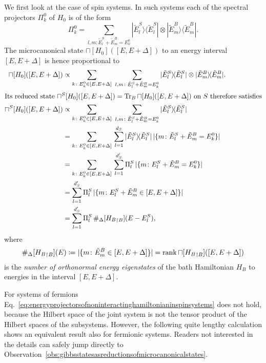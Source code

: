 \documentclass[a4paper,12pt,listof=totoc,index=totoc,bibliography=totoc,headsepline=false,headings=normal,BCOR16.153846mm,DIV12,headinclude,twoside,cleardoublepage=empty,numbers=noenddot,final]{scrreprt}
\theoremstyle{mystyle}
\numberwithin{equation}{section}
\numberwithin{figure}{section}
\numberwithin{lemma}{section}
\numberwithin{theorem}{section}
\numberwithin{corollary}{section}
\numberwithin{definition}{section}
\numberwithin{conjecture}{section}
\numberwithin{observation}{section}
\newcommand{\+}{\mkern2mu}
\newcommand{\coloneqq}{\mathrel{\vcentcolon\mkern-1.2mu=}} %
\newcommand{\texteqref}[1]{Eq.~\eqref{#1}}
\newcommand{\oftype}{\colon}
\newcommand{\suchthat}{\colon}
\renewcommand{\H}{H}
\newcommand{\rhomc}{{\sqcap}}
\newcommand{\bra}[1]{\langle #1|}
\newcommand{\ket}[1]{|#1\rangle}
\newcommand{\ketbra}[2]{\ket{#1}\!\bra{#2}}
\newcommand{\trunc}[2]{{#1}_{\upharpoonright \mathnormal{#2}}}
\DeclareMathOperator{\1}{\mathds{1}}
\DeclareMathOperator{\Tr}{Tr}
\DeclareMathOperator{\rank}{rank}
\begin{document}
We first look at the case of spin systems.
In such systems each of the spectral projectors $\Pi^0_k$ of $\H_0$ is of the form
\begin{equation}
  \Pi^0_k = \sum_{l,m\suchthat \tilde E^S_l+\tilde E^B_m=E^0_k} \ketbra{\tilde E^S_l}{\tilde E^S_l} \otimes \ketbra{\tilde E^B_m}{\tilde E^B_m} . \label{eq:energyprojectorsofnoninteractinghamiltonianinspinsystems}
\end{equation}
The microcanonical state $\rhomc[\H_0]([E,E+\Delta])$ to an energy interval $[E,E+\Delta]$ is hence proportional to
\begin{align}
  \rhomc[\H_0]([E,E+\Delta]) &\propto \sum_{k\suchthat E^0_k \in [E,E+\Delta]}\ \sum_{l,m\suchthat \tilde E^S_l+\tilde E^B_m=E^0_k} \ketbra{\tilde E^S_l}{\tilde E^S_l} \otimes \ketbra{\tilde E^B_m}{\tilde E^B_m} . \label{eq:firstequalityinthecountingargumentforspins}\\
  \intertext{Its reduced state $\rhomc^S[\H_0]([E,E+\Delta]) = \Tr_B \rhomc[\H_0]([E,E+\Delta])$ on $S$ therefore satisfies}
  \rhomc^S[\H_0]([E,E+\Delta]) &\propto \sum_{k\suchthat E^0_k \in [E,E+\Delta]}\ \sum_{l,m\suchthat \tilde E^S_l+\tilde  E^B_m=E^0_k} \ketbra{\tilde E^S_l}{\tilde E^S_l} \\
  &= \sum_{k\suchthat E^0_k \in [E,E+\Delta]}\, \sum_{l=1}^{d_S} \ketbra{\tilde E^S_l}{\tilde E^S_l} \, |\{m\oftype \tilde E^S_l+\tilde E^B_m=E^0_k \}| \\
  &= \sum_{k\suchthat E^0_k \in [E,E+\Delta]}\, \sum_{l=1}^{d_S'} \Pi^S_l \, |\{m\oftype E^S_l+\tilde E^B_m=E^0_k \}| \\
  &= \sum_{l=1}^{d_S'} \Pi^S_l \, |\{m\oftype E^S_l+\tilde E^B_m \in [E,E+\Delta] \}| \\
  &= \sum_{l=1}^{d_S'} \Pi^S_l \, \#_\Delta[\trunc{\H_B}B](E-E^S_l) ,
\end{align}
where
\begin{equation}
  \#_\Delta[\trunc{\H_B}B](E) \coloneqq |\{m\oftype \tilde E^B_m \in [E,E+\Delta] \}| = \rank\rhomc[\trunc{\H_B}B]([E,E+\Delta])
\end{equation}
is the \emph{number of orthonormal energy eigenstates} of the bath Hamiltonian $\H_B$ to energies in the interval $[E,E+\Delta]$.

For systems of fermions \texteqref{eq:energyprojectorsofnoninteractinghamiltonianinspinsystems} does not hold, because the Hilbert space of the joint system is not the tensor product of the Hilbert spaces of the subsystems.
However, the following quite lengthy calculation shows an equivalent result also for fermionic systems.
Readers not interested in the details can safely jump directly to Observation~\ref{obs:gibbsstatesasreductionsofmicrocanonicalstates}.
\end{document}
